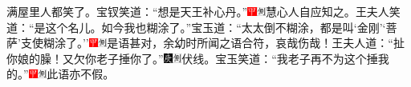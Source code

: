 满屋里人都笑了。宝钗笑道：``想是天王补心丹。''{\includegraphics[width=3mm]{../Images/00002}\includegraphics[width=3mm]{../Images/00011}\footnotesize \kaishu 慧心人自应知之。}王夫人笑道：``是这个名儿。如今我也糊涂了。''宝玉道：``太太倒不糊涂，都是叫`金刚'`菩萨'支使糊涂了。''{\includegraphics[width=3mm]{../Images/00002}\includegraphics[width=3mm]{../Images/00011}\footnotesize \kaishu 是语甚对，余幼时所闻之语合符，哀哉伤哉！}王夫人道：``扯你娘的臊！又欠你老子捶你了。''{\includegraphics[width=3mm]{../Images/00004}\includegraphics[width=3mm]{../Images/00011}\footnotesize \kaishu 伏线。}宝玉笑道：``我老子再不为这个捶我的。''{\includegraphics[width=3mm]{../Images/00002}\includegraphics[width=3mm]{../Images/00011}\footnotesize \kaishu 此语亦不假。}

